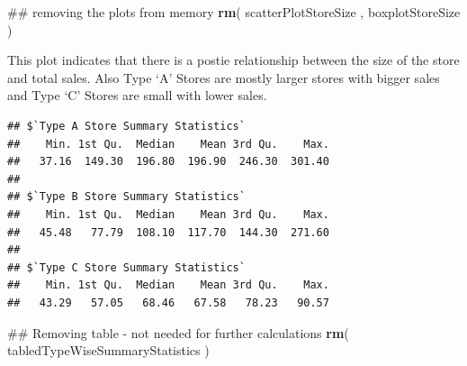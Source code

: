 \documentclass[]{article}
\newenvironment{Shaded}{\begin{snugshade}}{\end{snugshade}}
\newcommand{\KeywordTok}[1]{\textcolor[rgb]{0.13,0.29,0.53}{\textbf{{#1}}}}
\newcommand{\DecValTok}[1]{\textcolor[rgb]{0.00,0.00,0.81}{{#1}}}
\newcommand{\StringTok}[1]{\textcolor[rgb]{0.31,0.60,0.02}{{#1}}}
\newcommand{\NormalTok}[1]{{#1}}
\begin{document}
\begin{Shaded}
\begin{Highlighting}[]
\NormalTok{## removing the plots from memory}
\KeywordTok{rm}\NormalTok{( scatterPlotStoreSize , boxplotStoreSize )}
\end{Highlighting}
\end{Shaded}

This plot indicates that there is a postie relationship between the size
of the store and total sales. Also Type `A' Stores are mostly larger
stores with bigger sales and Type `C' Stores are small with lower sales.

\begin{Shaded}
\end{Shaded}

\begin{verbatim}
## $`Type A Store Summary Statistics`
##    Min. 1st Qu.  Median    Mean 3rd Qu.    Max. 
##   37.16  149.30  196.80  196.90  246.30  301.40 
## 
## $`Type B Store Summary Statistics`
##    Min. 1st Qu.  Median    Mean 3rd Qu.    Max. 
##   45.48   77.79  108.10  117.70  144.30  271.60 
## 
## $`Type C Store Summary Statistics`
##    Min. 1st Qu.  Median    Mean 3rd Qu.    Max. 
##   43.29   57.05   68.46   67.58   78.23   90.57
\end{verbatim}

\begin{Shaded}
\begin{Highlighting}[]
\NormalTok{## Removing table - not needed for further calculations}
\KeywordTok{rm}\NormalTok{( tabledTypeWiseSummaryStatistics )}
\end{Highlighting}
\end{Shaded}
\end{document}

